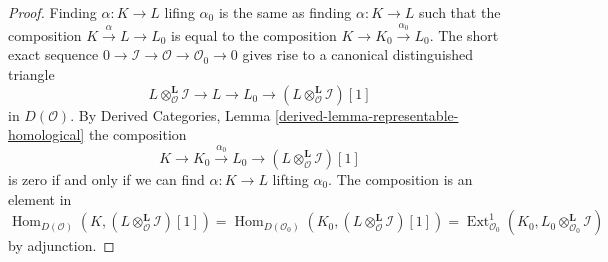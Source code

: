 \documentclass[10pt,a4paper]{amsart}
\theoremstyle{plain}
\theoremstyle{definition}
\theoremstyle{remark}
\numberwithin{equation}{subsection}
\def\Hom{\mathop{\mathrm{Hom}}\nolimits}
\def\Ext{\mathop{\mathrm{Ext}}\nolimits}
\begin{document}
\begin{proof}
Finding $\alpha : K \to L$ lifing $\alpha_0$ is the same as finding
$\alpha : K \to L$ such that the composition $K \xrightarrow{\alpha} L \to L_0$
is equal to the composition $K \to K_0 \xrightarrow{\alpha_0} L_0$.
The short exact sequence
$0 \to \mathcal{I} \to \mathcal{O} \to \mathcal{O}_0 \to 0$
gives rise to a canonical distinguished triangle
$$
L \otimes_\mathcal{O}^\mathbf{L} \mathcal{I} \to
L \to
L_0 \to
(L \otimes_\mathcal{O}^\mathbf{L} \mathcal{I})[1]
$$
in $D(\mathcal{O})$.
By Derived Categories, Lemma \ref{derived-lemma-representable-homological}
the composition
$$
K \to K_0 \xrightarrow{\alpha_0} L_0 \to
(L \otimes_\mathcal{O}^\mathbf{L} \mathcal{I})[1]
$$
is zero if and only if we can find $\alpha : K \to L$
lifting $\alpha_0$. The composition is an element in
$$
\Hom_{D(\mathcal{O})}(K, (L \otimes_\mathcal{O}^\mathbf{L} \mathcal{I})[1]) =
\Hom_{D(\mathcal{O}_0)}(K_0,
(L \otimes_\mathcal{O}^\mathbf{L} \mathcal{I})[1]) =
\Ext^1_{\mathcal{O}_0}(K_0,
L_0 \otimes_{\mathcal{O}_0}^\mathbf{L} \mathcal{I})
$$
by adjunction.
\end{proof}
\end{document}
